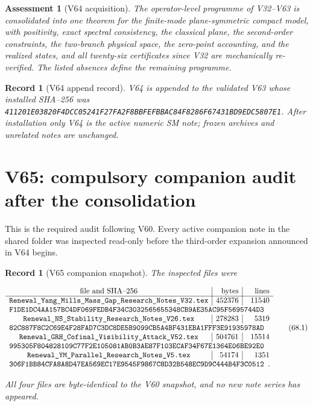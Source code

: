 \documentclass[11pt]{article}
\newtheorem{assessment}[theorem]{Assessment}
\newtheorem{record}[theorem]{Record}
\theoremstyle{remark}
\begin{document}
\begin{assessment}[V64 acquisition]
\label{ass:v19v64}
The operator-level programme of V32--V63 is consolidated into one
theorem for the finite-mode plane-symmetric compact model, with
positivity, exact spectral consistency, the classical plane, the
second-order constraints, the two-branch physical space, the
zero-point accounting, and the realized states, and all twenty-six
certificates since V32 are mechanically re-verified.  The listed
absences define the remaining programme.
\end{assessment}

\begin{record}[V64 append record]
\label{rec:v19v64}
V64 is appended to the validated V63 whose installed SHA--256 was
\texttt{411201E03820F4DCC05241F27FA2F8BBFEFBBAC84F8286F67431BD9EDC5807E1}.
After installation only V64 is the active numeric SM note; frozen
archives and unrelated notes are unchanged.
\end{record}


\section{V65: compulsory companion audit after the consolidation}
\label{sec:v19v65}

This is the required audit following V60.  Every active companion note
in the shared folder was inspected read-only before the third-order
expansion announced in V64 begins.

\begin{record}[V65 companion snapshot]
\label{rec:v19v65-snapshot}
The inspected files were

\[
\begin{array}{c|r|r}
\hbox{file and SHA--256}&\hbox{bytes}&\hbox{lines}\\ \hline
\texttt{Renewal\_Yang\_Mills\_Mass\_Gap\_Research\_Notes\_V32.tex}
&452376&11540\\
\multicolumn{3}{l}{
\texttt{F1DE1DC4AA157BC4DF069FEDB4F34C3032565655348CB9AE35AC95F5695744D3}}
\\
\texttt{Renewal\_NS\_Stability\_Research\_Notes\_V26.tex}
&278283&5319\\
\multicolumn{3}{l}{
\texttt{82C887F8C2C69E4F28FAD7C3DC8DE5B9099CB5A4BF431EBA1FFF3E91935978AD}}
\\
\texttt{Renewal\_GRH\_Cofinal\_Visibility\_Attack\_V52.tex}
&504761&15514\\
\multicolumn{3}{l}{
\texttt{995305F804828109C77F2E105081AB0B3AE87F103ECAF34F67E1364E06BE92E0}}
\\
\texttt{Renewal\_YM\_Parallel\_Research\_Notes\_V5.tex}
&54174&1351\\
\multicolumn{3}{l}{
\texttt{306F1BB84CFA8A8D47EA569EC17E9545F9867C8D32B548EC9D9C444B4F3C0512}}.
\end{array}                                                     \tag{68.1}
\]

All four files are byte-identical to the V60 snapshot, and no new
note series has appeared.
\end{record}
\end{document}

